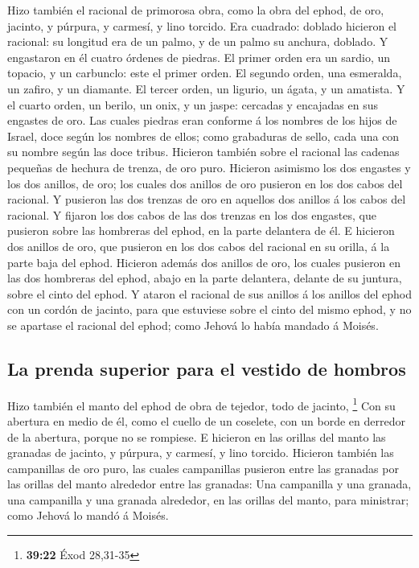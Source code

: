  Hizo también el racional de primorosa obra, como la obra
del ephod, de oro, jacinto, y púrpura, y carmesí, y lino torcido.
 Era cuadrado: doblado hicieron el racional: su longitud era
de un palmo, y de un palmo su anchura, doblado.  Y
engastaron en él cuatro órdenes de piedras. El primer orden era un
sardio, un topacio, y un carbunclo: este el primer orden. 
El segundo orden, una esmeralda, un zafiro, y un diamante. 
El tercer orden, un ligurio, un ágata, y un amatista.  Y el
cuarto orden, un berilo, un onix, y un jaspe: cercadas y encajadas en
sus engastes de oro.  Las cuales piedras eran conforme á
los nombres de los hijos de Israel, doce según los nombres de ellos;
como grabaduras de sello, cada una con su nombre según las doce tribus.
 Hicieron también sobre el racional las cadenas pequeñas de
hechura de trenza, de oro puro.  Hicieron asimismo los dos
engastes y los dos anillos, de oro; los cuales dos anillos de oro
pusieron en los dos cabos del racional.  Y pusieron las dos
trenzas de oro en aquellos dos anillos á los cabos del racional.
 Y fijaron los dos cabos de las dos trenzas en los dos
engastes, que pusieron sobre las hombreras del ephod, en la parte
delantera de él.  E hicieron dos anillos de oro, que
pusieron en los dos cabos del racional en su orilla, á la parte baja del
ephod.  Hicieron además dos anillos de oro, los cuales
pusieron en las dos hombreras del ephod, abajo en la parte delantera,
delante de su juntura, sobre el cinto del ephod.  Y ataron
el racional de sus anillos á los anillos del ephod con un cordón de
jacinto, para que estuviese sobre el cinto del mismo ephod, y no se
apartase el racional del ephod; como Jehová lo había mandado á Moisés.

\hypertarget{la-prenda-superior-para-el-vestido-de-hombros-1}{%
\subsection{La prenda superior para el vestido de
hombros}\label{la-prenda-superior-para-el-vestido-de-hombros-1}}

 Hizo también el manto del ephod de obra de tejedor, todo
de jacinto, \footnote{\textbf{39:22} Éxod 28,31-35}  Con su
abertura en medio de él, como el cuello de un coselete, con un borde en
derredor de la abertura, porque no se rompiese.  E hicieron
en las orillas del manto las granadas de jacinto, y púrpura, y carmesí,
y lino torcido.  Hicieron también las campanillas de oro
puro, las cuales campanillas pusieron entre las granadas por las orillas
del manto alrededor entre las granadas:  Una campanilla y
una granada, una campanilla y una granada alrededor, en las orillas del
manto, para ministrar; como Jehová lo mandó á Moisés.

